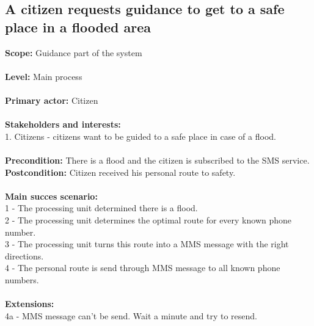 \subsection{A citizen requests guidance to get to a safe place in a flooded area}
\textbf{Scope:} Guidance part of the system\\\\
\textbf{Level:} Main process\\\\
\textbf{Primary actor:} Citizen\\\\
\textbf{Stakeholders and interests:}\\
	1. Citizens - citizens want to be guided to a safe place in case of a flood. \\\\
\textbf{Precondition:} There is a flood and the citizen is subscribed to the SMS service. \\
\textbf{Postcondition:} Citizen received his personal route to safety. \\\\
\textbf{Main succes scenario:} \\
1 - The processing unit determined there is a flood.\\
2 - The processing unit determines the optimal route for every known phone number.\\
3 - The processing unit turns this route into a MMS message with the right directions.\\
4 - The personal route is send through MMS message to all known phone numbers.\\\\
\textbf{Extensions:} \\
4a - MMS message can't be send. Wait a minute and try to resend.\\

